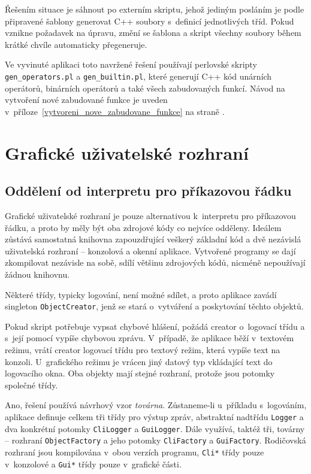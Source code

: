 \documentclass[11pt,twoside,a4paper]{book}
\begin{document}
Řešením situace je sáhnout po externím skriptu, jehož jediným posláním je podle při\-pra\-ve\-né šablony generovat C++ soubory s~definicí jednotlivých tříd. Pokud vznikne požadavek na úpravu, změní se šablona a skript všechny soubory během krátké chvíle automaticky přegeneruje.

Ve vyvinuté aplikaci toto navržené řešení používají perlovské skripty \texttt{gen\_\-ope\-ra\-tors.pl} a \texttt{gen\_builtin.pl}, které generují C++ kód unárních operátorů, binárních operátorů a také všech zabudovaných funkcí. Návod na vytvoření nové zabudované funkce je uveden v~příloze~\ref{vytvoreni_nove_zabudovane_funkce} na straně \pageref{vytvoreni_nove_zabudovane_funkce}.


\clearpage
\section{Grafické uživatelské rozhraní}

\subsection{Oddělení od interpretu pro příkazovou řádku}
\label{oddeleni_od_interpretu_pro_prikazovou_radku}

Grafické uživatelské rozhraní je pouze alternativou k~interpretu pro příkazovou řádku, a proto by měly být oba zdrojové kódy co nejvíce odděleny. Ideálem zůstává samostatná knihovna zapouzdřující veškerý základní kód a dvě nezávislá uživatelská rozhraní -- konzolová a okenní aplikace. Vytvořené programy se dají zkompilovat nezávisle na sobě, sdílí většinu zdrojových kódů, nicméně nepoužívají žádnou knihovnu.

Některé třídy, typicky logování, není možné sdílet, a proto aplikace zavádí singleton \texttt{Ob\-ject\-Cre\-a\-tor}, jenž se stará o~vytváření a poskytování těchto objektů.

Pokud skript potřebuje vypsat chybové hlášení, požádá creator o~logovací třídu a s~její pomocí vypíše chybovou zprávu. V~případě, že aplikace běží v~textovém režimu, vrátí creator logovací třídu pro textový režim, která vypíše text na konzoli. U~grafického režimu je vrácen jiný datový typ vkládající text do logovacího okna. Oba objekty mají stejné rozhraní, protože jsou potomky společné třídy.

Ano, řešení používá návrhový vzor \textit{továrna}. Zůstaneme-li u~příkladu s~logováním, aplikace definuje celkem tři třídy pro výstup zpráv, abstraktní nadtřídu \texttt{Logger} a dva konkrétní potomky \texttt{CliLogger} a \texttt{GuiLogger}. Dále využívá, taktéž tři, továrny -- rozhraní \texttt{ObjectFactory} a jeho potomky \texttt{CliFactory} a \texttt{GuiFactory}. Rodičovská rozhraní jsou kompilována v~obou verzích programu, \texttt{Cli*} třídy pouze v~konzolové a \texttt{Gui*} třídy pouze v~grafické části.
\end{document}
